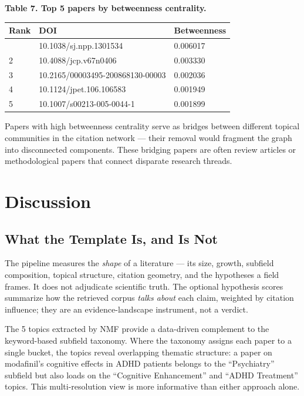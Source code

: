 \documentclass[
  english,
]{article}
\newcounter{none} %
\begin{document}
\textbf{Table 7. Top 5 papers by betweenness centrality.}

{\def\LTcaptype{none} %
\begin{longtable}[]{@{}lll@{}}
\toprule\noalign{}
Rank & DOI & Betweenness \\
\midrule\noalign{}
\endhead
\bottomrule\noalign{}
\endlastfoot
1 & 10.1038/sj.npp.1301534 & 0.006017 \\
2 & 10.4088/jcp.v67n0406 & 0.003330 \\
3 & 10.2165/00003495-200868130-00003 & 0.002036 \\
4 & 10.1124/jpet.106.106583 & 0.001949 \\
5 & 10.1007/s00213-005-0044-1 & 0.001899 \\
\end{longtable}
}

Papers with high betweenness centrality serve as bridges between
different topical communities in the citation network --- their removal
would fragment the graph into disconnected components. These bridging
papers are often review articles or methodological papers that connect
disparate research threads.

\newpage

\section{Discussion}\label{discussion}

\subsection{What the Template Is, and Is
Not}\label{what-the-template-is-and-is-not}

The pipeline measures the \emph{shape} of a literature --- its size,
growth, subfield composition, topical structure, citation geometry, and
the hypotheses a field frames. It does not adjudicate scientific truth.
The optional hypothesis scores summarize how the retrieved corpus
\emph{talks about} each claim, weighted by citation influence; they are
an evidence-landscape instrument, not a verdict.

The 5 topics extracted by NMF provide a data-driven complement to the
keyword-based subfield taxonomy. Where the taxonomy assigns each paper
to a single bucket, the topics reveal overlapping thematic structure: a
paper on modafinil's cognitive effects in ADHD patients belongs to the
``Psychiatry'' subfield but also loads on the ``Cognitive Enhancement''
and ``ADHD Treatment'' topics. This multi-resolution view is more
informative than either approach alone.
\end{document}
